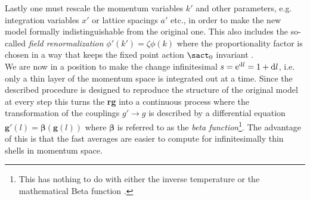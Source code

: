 \documentclass[english, parskip=full]{scrartcl}
\renewcommand{\gls}[1]{\textbf{#1}}
\newcommand{\tpspace}{momentum space}
\newcommand{\rgbeta}{\bm{\beta}}
\begin{document}
Lastly one must rescale the momentum variables $k'$ and other parameters, e.g. integration variables $x'$ or lattice spacings $a'$ etc., in order to make the new model formally indistinguishable from the original one.
This also includes the so-called \emph{field renormalization} $\phi'(k') = \zeta \phi(k)$ where the proportionality factor is chosen in a way that keeps the fixed point action $\sact_0$ invariant \cites[]{Bosonization_Shankar_1994}[]{AltlandSimons}.\\
We are now in a position to make the change infinitesimal $s=\text{e}^{\text{d} l} = 1 + \text{d} l$, i.e. only a thin layer of the \tpspace{} is integrated out at a time.
Since the described procedure is designed to reproduce the structure of the original model at every step this turns the \gls{rg} into a continuous process where the transformation of the couplings $g'\rightarrow g$ is described by a differential equation $\textbf{g}'(l) = \rgbeta(\textbf{g}(l))$ where $\rgbeta$ is referred to as the \emph{beta function}\footnote{This has nothing to do with either the inverse temperature or the mathematical Beta function \cite[]{AltlandSimons}.}.
The advantage of this is that the fast averages are easier to compute for infinitesimally thin shells in \tpspace{}.
\end{document}
